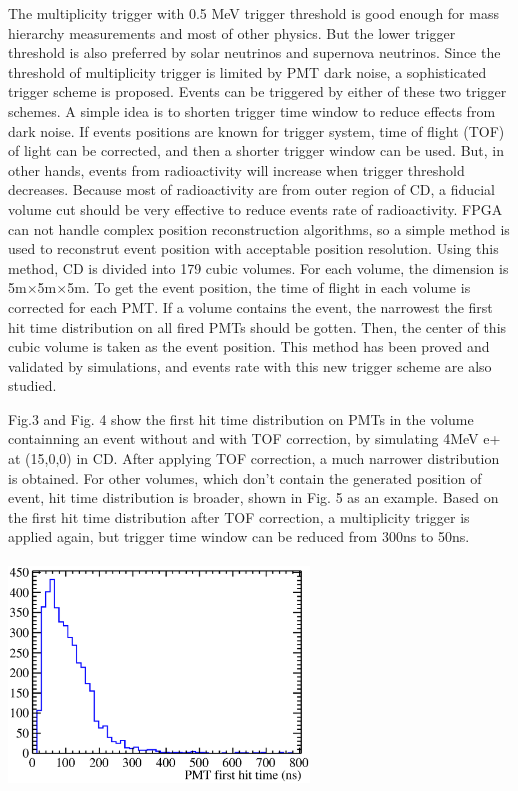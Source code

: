 \documentclass[a4paper,10pt,twoside]{paper}
\begin{document}
\begin{multicols}{2}
		The multiplicity trigger with 0.5 MeV trigger threshold is good enough for mass hierarchy measurements and most of other physics. 
		But the lower trigger threshold is also preferred by solar neutrinos and supernova neutrinos.
		Since the threshold of multiplicity trigger is limited by PMT dark noise, a sophisticated trigger scheme is proposed.
		Events can be triggered by either of these two trigger schemes. A simple idea is to shorten trigger time window to reduce effects from dark noise.
		If events positions are known for trigger system, time of flight (TOF) of light can be corrected, and then a shorter trigger window can be used.
		But, in other hands, events from radioactivity will increase when trigger threshold decreases.
		Because most of radioactivity are from outer region of CD, a fiducial volume cut should be very effective to reduce events rate of radioactivity.
		FPGA can not handle complex position reconstruction algorithms, so a simple method is used to reconstrut event position with acceptable position resolution.
		Using this method, CD is divided into 179 cubic volumes. For each volume, the dimension is 5m$\times$5m$\times$5m.
		To get the event position, the time of flight in each volume is corrected for each PMT. If a volume contains the event, 
		the narrowest the first hit time distribution on all fired PMTs should be gotten. 
		Then, the center of this cubic volume is taken as the event position.
		This method has been proved and validated by simulations, and events rate with this new trigger scheme are also studied.

		Fig.3 and Fig. 4 show the first hit time distribution on PMTs in the volume containning an event without and with TOF correction, 
		by simulating 4MeV e+ at (15,0,0) in CD. After applying TOF correction, a much narrower distribution is obtained.
		For other volumes, which don't contain the generated position of event, hit time distribution is broader, shown in Fig. 5 as an example.
		Based on the first hit time distribution after TOF correction, a multiplicity trigger is applied again, but trigger time window can be reduced from
		300ns to 50ns. 

		\begin{center}
			\includegraphics[width=8cm,height=6cm]{4MeV_e+_PMT_first_hitTime.eps}
		\end{center}



\end{multicols}
\end{document}

